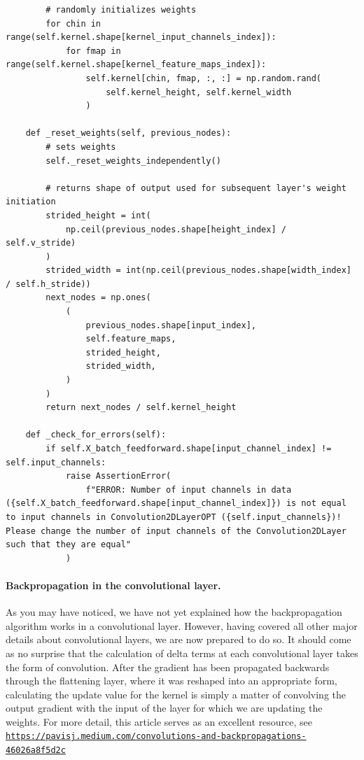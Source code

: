 \documentclass[%
oneside,                 %
final,                   %
10pt]{article}
\begin{document}
\begin{verbatim}
        # randomly initializes weights
        for chin in range(self.kernel.shape[kernel_input_channels_index]):
            for fmap in range(self.kernel.shape[kernel_feature_maps_index]):
                self.kernel[chin, fmap, :, :] = np.random.rand(
                    self.kernel_height, self.kernel_width
                )

    def _reset_weights(self, previous_nodes):
        # sets weights
        self._reset_weights_independently()

        # returns shape of output used for subsequent layer's weight initiation
        strided_height = int(
            np.ceil(previous_nodes.shape[height_index] / self.v_stride)
        )
        strided_width = int(np.ceil(previous_nodes.shape[width_index] / self.h_stride))
        next_nodes = np.ones(
            (
                previous_nodes.shape[input_index],
                self.feature_maps,
                strided_height,
                strided_width,
            )
        )
        return next_nodes / self.kernel_height

    def _check_for_errors(self):
        if self.X_batch_feedforward.shape[input_channel_index] != self.input_channels:
            raise AssertionError(
                f"ERROR: Number of input channels in data ({self.X_batch_feedforward.shape[input_channel_index]}) is not equal to input channels in Convolution2DLayerOPT ({self.input_channels})! Please change the number of input channels of the Convolution2DLayer such that they are equal"
            )

\end{verbatim}


\paragraph{Backpropagation in the convolutional layer.}
As you may have noticed, we have not yet explained how the
backpropagation algorithm works in a convolutional layer. However,
having covered all other major details about convolutional layers, we
are now prepared to do so. It should come as no surprise that the
calculation of delta terms at each convolutional layer takes the form
of convolution. After the gradient has been propagated backwards
through the flattening layer, where it was reshaped into an
appropriate form, calculating the update value for the kernel is
simply a matter of convolving the output gradient with the input of
the layer for which we are updating the weights. For more detail, this
article serves as an excellent resource, see
\href{{https://pavisj.medium.com/convolutions-and-backpropagations-46026a8f5d2c}}{\nolinkurl{https://pavisj.medium.com/convolutions-and-backpropagations-46026a8f5d2c}}
\end{document}
